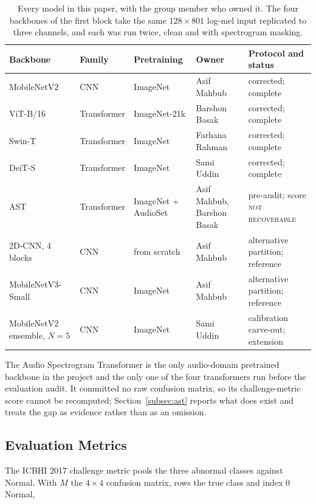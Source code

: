 \documentclass[journal,onecolumn]{IEEEtran}
\newcommand{\notrec}{\textsc{not recoverable}}
\begin{document}
\begin{table}[!t]
\centering
\caption{Every model in this paper, with the group member who owned it. The four backbones
of the first block take the same $128 \times 801$ log-mel input replicated to three
channels, and each was run twice, clean and with spectrogram masking.}
\label{tab:models}
\footnotesize
\begin{tabular}{lllll}
\toprule
Backbone & Family & Pretraining & Owner & Protocol and status \\
\midrule
MobileNetV2~\cite{sandler2018mobilenetv2} & CNN & ImageNet & Asif Mahbub & corrected; complete \\
ViT-B/16~\cite{dosovitskiy2021vit} & Transformer & ImageNet-21k & Barshon Basak & corrected; complete \\
Swin-T~\cite{liu2021swin} & Transformer & ImageNet & Farhana Rahman & corrected; complete \\
DeiT-S~\cite{touvron2021deit} & Transformer & ImageNet & Sami Uddin & corrected; complete \\
\midrule
AST~\cite{gong2021ast} & Transformer & ImageNet + AudioSet & Asif Mahbub, Barshon Basak & pre-audit; score \notrec \\
2D-CNN, 4 blocks & CNN & from scratch & Asif Mahbub & alternative partition; reference \\
MobileNetV3-Small & CNN & ImageNet & Asif Mahbub & alternative partition; reference \\
MobileNetV2 ensemble, $N{=}5$ & CNN & ImageNet & Sami Uddin & calibration carve-out; extension \\
\bottomrule
\end{tabular}

\vspace{2pt}
\footnotesize The Audio Spectrogram Transformer is the only audio-domain pretrained backbone in
the project and the only one of the four transformers run before the evaluation audit. It
committed no raw confusion matrix, so its challenge-metric score cannot be recomputed;
Section~\ref{subsec:ast} reports what does exist and treats the gap as evidence rather than as
an omission.
\end{table}

\subsection{Evaluation Metrics}
\label{subsec:metrics}

The ICBHI 2017 challenge metric pools the three abnormal classes against Normal. With $M$ the
$4\times4$ confusion matrix, rows the true class and index 0 Normal,
\end{document}

